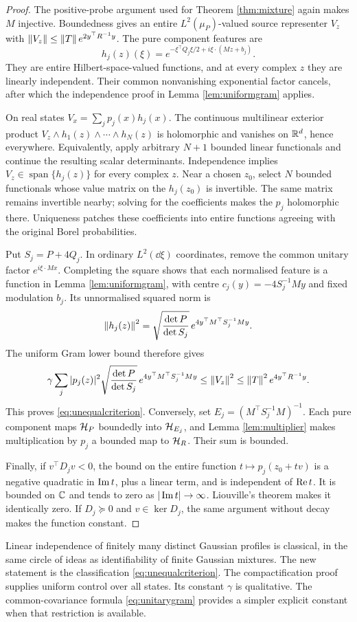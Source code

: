 \begin{proof}
The positive-probe argument used for Theorem \ref{thm:mixture}
again makes $M$ injective. Boundedness gives an entire
$L^2(\mu_P)$-valued source representer $V_z$ with
$\left\lVert V_z\right\rVert\le\left\lVert T\right\rVert e^{2y^\top R^{-1}y}$.
The pure component features are
\[
 h_j(z)(\xi)=
 e^{-\xi^\top Q_j\xi/2+i\xi\cdot(Mz+b_j)}.
\]
They are entire Hilbert-space-valued functions, and at every
complex $z$ they are linearly independent. Their common
nonvanishing exponential factor cancels, after which the
independence proof in Lemma \ref{lem:uniformgram} applies.

On real states $V_x=\sum_jp_j(x)h_j(x)$. The continuous
multilinear exterior product
$V_z\wedge h_1(z)\wedge\cdots\wedge h_N(z)$ is holomorphic
and vanishes on $\mathbb R^d$, hence everywhere. Equivalently,
apply arbitrary $N+1$ bounded linear functionals and continue
the resulting scalar determinants. Independence implies
$V_z\in\operatorname{span}\{h_j(z)\}$ for every complex $z$.
Near a chosen $z_0$, select $N$ bounded functionals whose
value matrix on the $h_j(z_0)$ is invertible. The same
matrix remains invertible nearby; solving for the
coefficients makes the $p_j$ holomorphic there. Uniqueness
patches these coefficients into entire functions agreeing
with the original Borel probabilities.

Put $S_j=P+4Q_j$. In ordinary $L^2(\dd\xi)$ coordinates,
remove the common unitary factor $e^{i\xi\cdot Mx}$.
Completing the square shows that each normalised feature
is a function in Lemma \ref{lem:uniformgram}, with
centre $c_j(y)=-4S_j^{-1}My$ and fixed modulation $b_j$.
Its unnormalised squared norm is
\[
 \left\lVert h_j(z)\right\rVert^2=
 \sqrt{\frac{\det P}{\det S_j}}\,
       e^{4y^\top M^\top S_j^{-1}My}.
\]
The uniform Gram lower bound therefore gives
\[
 \gamma\sum_j|p_j(z)|^2
       \sqrt{\frac{\det P}{\det S_j}}\,
       e^{4y^\top M^\top S_j^{-1}My}
 \le\left\lVert V_z\right\rVert^2
 \le\left\lVert T\right\rVert^2e^{4y^\top R^{-1}y}.
\]
This proves \eqref{eq:unequalcriterion}. Conversely, set
$E_j=(M^\top S_j^{-1}M)^{-1}$. Each pure component maps
$\mathcal H_P$ boundedly into $\mathcal H_{E_j}$, and
Lemma \ref{lem:multiplier} makes multiplication by $p_j$
a bounded map to $\mathcal H_R$. Their sum is bounded.

Finally, if $v^\top D_jv<0$, the bound on the entire
function $t\mapsto p_j(z_0+tv)$ is a negative quadratic
in $\operatorname{Im} t$, plus a linear term, and is independent of
$\operatorname{Re} t$. It is bounded on $\mathbb C$ and tends to zero as
$|\operatorname{Im} t|\to\infty$. Liouville's theorem makes it identically
zero. If $D_j\succeq0$ and $v\in\ker D_j$, the same
argument without decay makes the function constant.
\end{proof}

Linear independence of finitely many distinct Gaussian profiles is
classical, in the same circle of ideas as identifiability of finite
Gaussian mixtures. The new statement is the classification
\eqref{eq:unequalcriterion}. The compactification proof supplies
uniform control over all states. Its constant $\gamma$ is
qualitative. The common-covariance formula \eqref{eq:unitarygram}
provides a simpler explicit constant when that restriction is
available.
